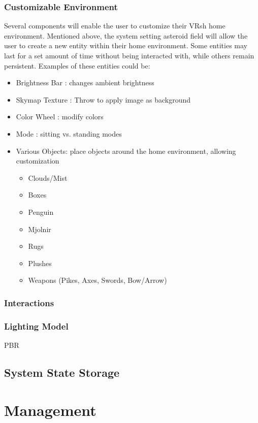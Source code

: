 \documentclass[titlepage,12pt]{article}
\newcommand\name{VRsh\xspace}
\begin{document}
\subsubsection{Customizable Environment}\label{sec:env}
Several components will enable the user to customize their \name home
environment. Mentioned above, the system setting asteroid field will 
allow the user to create a new entity within their home environment.
Some entities may last for a set amount of time without being interacted
with, while others remain persistent. Examples of these entities could be:
\begin{itemize}
    \item Brightness Bar : changes ambient brightness
    \item Skymap Texture : Throw to apply image as background
    \item Color Wheel    : modify colors
    \item Mode           : sitting vs. standing modes
    \item Various Objects: place objects around the home environment, 
    allowing customization
    \begin{itemize}
        \item Clouds/Mist
        \item Boxes
        \item Penguin
        \item Mjolnir
        \item Rugs
        \item Plushes
        \item Weapons (Pikes, Axes, Swords, Bow/Arrow)
    \end{itemize}
\end{itemize}

\subsubsection{Interactions}

\subsubsection{Lighting Model}
PBR

\subsection{System State Storage}\label{sec:state}

\section{Management}
\end{document}
